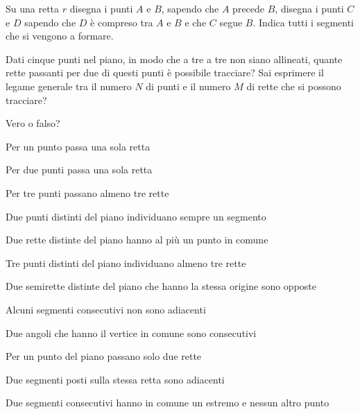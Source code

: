 \begin{esercizio}
\label{ese:1.47}
Su una retta \(r\) disegna i punti \(A\) e \(B\), sapendo che \(A\) precede 
\(B\), disegna i punti \(C\) e \(D\) sapendo che \(D\) è compreso tra \(A\) e 
\(B\) e che \(C\) segue \(B\). Indica tutti i segmenti che si vengono a 
formare.
\end{esercizio}

\begin{esercizio}
\label{ese:1.48}
Dati cinque punti nel piano, in modo che a tre a tre non siano 
allineati, quante rette passanti per due di questi punti è possibile 
tracciare? Sai esprimere il legame generale tra il numero \(N\) di 
punti e il numero \(M\) di rette che si possono tracciare?
\end{esercizio}

\begin{esercizio}
\label{ese:1.49}
Vero o falso?
\begin{enumeratea}
\item Per un punto passa una sola retta		\hfill\boxV\quad\boxF
\item Per due punti passa una sola retta		
\hfill\boxV\quad\boxF
\item Per tre punti passano almeno tre rette	\hfill\boxV\quad\boxF
\item Due punti distinti del piano individuano sempre un 
segmento	\hfill\boxV\quad\boxF
\item Due rette distinte del piano hanno al più un punto in 
comune	\hfill\boxV\quad\boxF
\item Tre punti distinti del piano individuano almeno tre rette	
\hfill\boxV\quad\boxF
\item Due semirette distinte del piano che hanno la stessa origine 
sono opposte	\hfill\boxV\quad\boxF
\item Alcuni segmenti consecutivi non sono adiacenti		
\hfill\boxV\quad\boxF
\item Due angoli che hanno il vertice in comune sono 
consecutivi		\hfill\boxV\quad\boxF
\item Per un punto del piano passano solo due rette		
\hfill\boxV\quad\boxF
\item Due segmenti posti sulla stessa retta sono adiacenti	
\hfill\boxV\quad\boxF
\item Due segmenti consecutivi hanno in comune un estremo e nessun 
altro punto		\hfill\boxV\quad\boxF
\end{enumeratea}
\end{esercizio}

